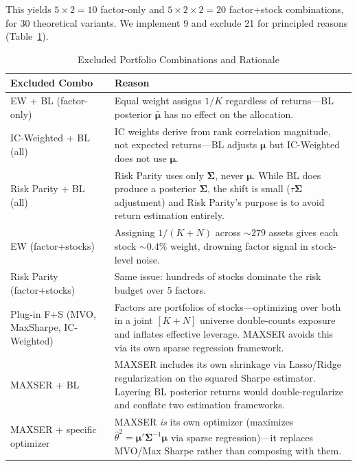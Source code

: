 \documentclass[12pt,a4paper]{article}
\begin{document}
This yields $5 \times 2 = 10$ factor-only and $5 \times 2 \times 2 = 20$ factor+stock combinations, for 30 theoretical variants. We implement 9 and exclude 21 for principled reasons (Table~\ref{tab:exclusions}).

\begin{table}[H]
\centering
\caption{Excluded Portfolio Combinations and Rationale}
\label{tab:exclusions}
\small
\begin{tabular}{p{4.5cm}p{10cm}}
\toprule
\textbf{Excluded Combo} & \textbf{Reason} \\
\midrule
EW + BL (factor-only) & Equal weight assigns $1/K$ regardless of returns---BL posterior $\bar{\boldsymbol{\mu}}$ has no effect on the allocation. \\
IC-Weighted + BL (all) & IC weights derive from rank correlation magnitude, not expected returns---BL adjusts $\boldsymbol{\mu}$ but IC-Weighted does not use $\boldsymbol{\mu}$. \\
Risk Parity + BL (all) & Risk Parity uses only $\boldsymbol{\Sigma}$, never $\boldsymbol{\mu}$. While BL does produce a posterior $\boldsymbol{\Sigma}$, the shift is small ($\tau\boldsymbol{\Sigma}$ adjustment) and Risk Parity's purpose is to avoid return estimation entirely. \\
EW (factor+stocks) & Assigning $1/(K+N)$ across ${\sim}279$ assets gives each stock ${\sim}0.4\%$ weight, drowning factor signal in stock-level noise. \\
Risk Parity (factor+stocks) & Same issue: hundreds of stocks dominate the risk budget over 5 factors. \\
Plug-in F+S (MVO, MaxSharpe, IC-Weighted) & Factors are portfolios of stocks---optimizing over both in a joint $[K+N]$ universe double-counts exposure and inflates effective leverage. MAXSER avoids this via its own sparse regression framework. \\
MAXSER + BL & MAXSER includes its own shrinkage via Lasso/Ridge regularization on the squared Sharpe estimator. Layering BL posterior returns would double-regularize and conflate two estimation frameworks. \\
MAXSER + specific optimizer & MAXSER \textit{is} its own optimizer (maximizes $\hat{\theta}^2 = \boldsymbol{\mu}'\boldsymbol{\Sigma}^{-1}\boldsymbol{\mu}$ via sparse regression)---it replaces MVO/Max Sharpe rather than composing with them. \\
\bottomrule
\end{tabular}
\end{table}
\end{document}
